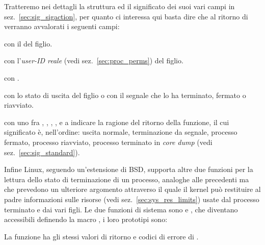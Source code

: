 Tratteremo nei dettagli la struttura  ed il significato dei
suoi vari campi in sez.~\ref{sec:sig_sigaction}, per quanto ci interessa qui
basta dire che al ritorno di  verranno avvalorati i seguenti
campi:
\begin{basedescript}{\desclabelwidth{1.8cm}}
\item[\var{si\_pid}] con il  del figlio.
\item[\var{si\_uid}] con l'\textsl{user-ID reale} (vedi
  sez.~\ref{sec:proc_perms}) del figlio.
\item[\var{si\_signo}] con .
\item[\var{si\_status}] con lo stato di uscita del figlio o con il segnale che
  lo ha terminato, fermato o riavviato.
\item[\var{si\_code}] con uno fra , ,
  , ,  e
   a indicare la ragione del ritorno della funzione, il cui
  significato è, nell'ordine: uscita normale, terminazione da segnale,
  processo fermato, processo riavviato, processo terminato in
  \textit{core dump} (vedi sez.~\ref{sec:sig_standard}).
\end{basedescript}

Infine Linux, seguendo un'estensione di BSD, supporta altre due funzioni per
la lettura dello stato di terminazione di un processo, analoghe alle
precedenti ma che prevedono un ulteriore argomento attraverso il quale il
kernel può restituire al padre informazioni sulle risorse (vedi
sez.~\ref{sec:sys_res_limits}) usate dal processo terminato e dai vari figli.
Le due funzioni di sistema sono  e , che diventano
accessibili definendo la macro , i loro prototipi sono:

\begin{funcproto}{ 
}
{La funzione ha gli stessi valori di ritorno e codici di errore di
  . }
\end{funcproto}

